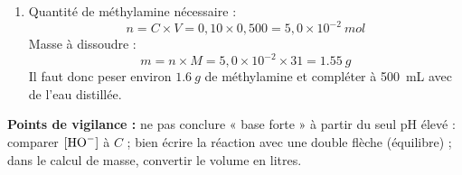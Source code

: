 \documentclass[11pt]{article}
\begin{document}
\begin{corrige}
\begin{enumerate}
Justification : le groupe méthyle  est \textbf{donneur d'électrons} (effet inductif donneur $+I$) : il enrichit l'atome d'azote en électrons, ce qui rend le doublet non liant \textbf{plus disponible} pour capter un proton et stabilise le cation  formé.
\item Quantité de méthylamine nécessaire :
\[ n = C \times V = 0{,}10 \times 0{,}500 = 5{,}0 \times 10^{-2}\ \si{mol} \]
Masse à dissoudre :
\[ m = n \times M = 5{,}0 \times 10^{-2} \times 31 = \SI{1,55}{g} \]
Il faut donc peser environ $\boxed{\SI{1,6}{g}}$ de méthylamine et compléter à \SI{500}{mL} avec de l'eau distillée.
\end{enumerate}
\textbf{Points de vigilance :} ne pas conclure « base forte » à partir du seul pH élevé : comparer $[\ce{HO-}]$ à $C$ ; bien écrire la réaction avec une double flèche \ce{<=>} (équilibre) ; dans le calcul de masse, convertir le volume en litres.
\end{corrige}
\end{document}
